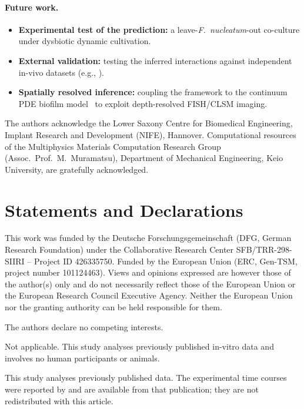 \documentclass[pdflatex,sn-mathphys-ay,lineno]{sn-jnl}%
\begin{document}
\paragraph{Future work.}
\begin{itemize}[nosep,leftmargin=*]
    \item \textbf{Experimental test of the prediction:} a leave-\textit{F.~nucleatum}-out co-culture under dysbiotic dynamic cultivation.
    \item \textbf{External validation:} testing the inferred interactions against independent in-vivo datasets (e.g., \citet{dieckow2024structure}).
    \item \textbf{Spatially resolved inference:} coupling the framework to the continuum PDE biofilm model~\citep{Klempt2025ContinuumBiofilm} to exploit depth-resolved FISH/CLSM imaging.
\end{itemize}

\backmatter

The authors acknowledge the Lower Saxony Centre for Biomedical Engineering, Implant Research and Development (NIFE), Hannover.
Computational resources of the Multiphysics Materials Computation Research Group (Assoc.\ Prof.\ M.~Muramatsu), Department of Mechanical Engineering, Keio University, are gratefully acknowledged.

\section*{Statements and Declarations}

This work was funded by the Deutsche Forschungsgemeinschaft (DFG, German Research Foundation) under the Collaborative Research Center SFB/TRR-298-SIIRI -- Project ID 426335750.
Funded by the European Union (ERC, Gen-TSM, project number 101124463). Views and opinions expressed are however those of the author(s) only and do not necessarily reflect those of the European Union or the European Research Council Executive Agency. Neither the European Union nor the granting authority can be held responsible for them.

The authors declare no competing interests.

Not applicable. This study analyses previously published in-vitro data and involves no human participants or animals.

This study analyses previously published data. The experimental time courses were reported by \citet{heine2025influence} and are available from that publication; they are not redistributed with this article.
\end{document}
